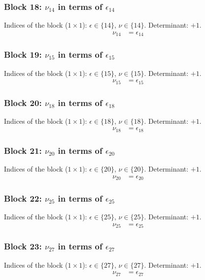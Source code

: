 \subsubsection{Block 18: $\nu_{14}$ in terms of $\epsilon_{14}$}
Indices of the block ($1\times 1$): $\epsilon \in \{14\}$, $\nu \in \{14\}$.
Determinant: $+1$.
\begin{align*}
\nu_{14} &= \epsilon_{14}
\end{align*}

\subsubsection{Block 19: $\nu_{15}$ in terms of $\epsilon_{15}$}
Indices of the block ($1\times 1$): $\epsilon \in \{15\}$, $\nu \in \{15\}$.
Determinant: $+1$.
\begin{align*}
\nu_{15} &= \epsilon_{15}
\end{align*}

\subsubsection{Block 20: $\nu_{18}$ in terms of $\epsilon_{18}$}
Indices of the block ($1\times 1$): $\epsilon \in \{18\}$, $\nu \in \{18\}$.
Determinant: $+1$.
\begin{align*}
\nu_{18} &= \epsilon_{18}
\end{align*}

\subsubsection{Block 21: $\nu_{20}$ in terms of $\epsilon_{20}$}
Indices of the block ($1\times 1$): $\epsilon \in \{20\}$, $\nu \in \{20\}$.
Determinant: $+1$.
\begin{align*}
\nu_{20} &= \epsilon_{20}
\end{align*}

\subsubsection{Block 22: $\nu_{25}$ in terms of $\epsilon_{25}$}
Indices of the block ($1\times 1$): $\epsilon \in \{25\}$, $\nu \in \{25\}$.
Determinant: $+1$.
\begin{align*}
\nu_{25} &= \epsilon_{25}
\end{align*}

\subsubsection{Block 23: $\nu_{27}$ in terms of $\epsilon_{27}$}
Indices of the block ($1\times 1$): $\epsilon \in \{27\}$, $\nu \in \{27\}$.
Determinant: $+1$.
\begin{align*}
\nu_{27} &= \epsilon_{27}
\end{align*}

